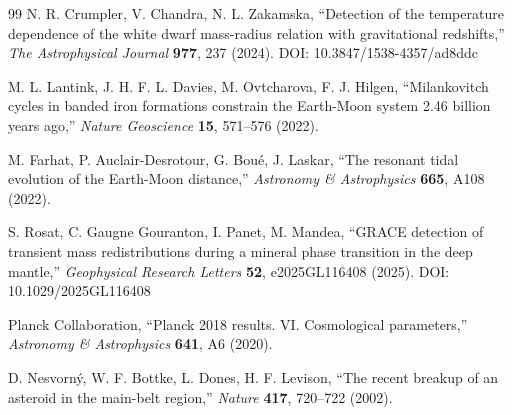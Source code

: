 \documentclass[11pt,a4paper]{article}
\begin{document}
\begin{thebibliography}{99}
		N. R. Crumpler, V. Chandra, N. L. Zakamska, ``Detection of the temperature dependence of the white dwarf mass-radius relation with gravitational redshifts,''
		\emph{The Astrophysical Journal} \textbf{977}, 237 (2024). DOI: 10.3847/1538-4357/ad8ddc
		
		M. L. Lantink, J. H. F. L. Davies, M. Ovtcharova, F. J. Hilgen, ``Milankovitch cycles in banded iron formations constrain the Earth-Moon system 2.46 billion years ago,''
		\emph{Nature Geoscience} \textbf{15}, 571–576 (2022).
		
		M. Farhat, P. Auclair-Desrotour, G. Boué, J. Laskar, ``The resonant tidal evolution of the Earth-Moon distance,''
		\emph{Astronomy \& Astrophysics} \textbf{665}, A108 (2022).
		
		S. Rosat, C. Gaugne Gouranton, I. Panet, M. Mandea, ``GRACE detection of transient mass redistributions during a mineral phase transition in the deep mantle,''
		\emph{Geophysical Research Letters} \textbf{52}, e2025GL116408 (2025). DOI: 10.1029/2025GL116408
		
		Planck Collaboration, ``Planck 2018 results. VI. Cosmological parameters,''
		\emph{Astronomy \& Astrophysics} \textbf{641}, A6 (2020).
		
		D. Nesvorný, W. F. Bottke, L. Dones, H. F. Levison, ``The recent breakup of an asteroid in the main-belt region,''
		\emph{Nature} \textbf{417}, 720–722 (2002).
		

\end{thebibliography}
\end{document}
